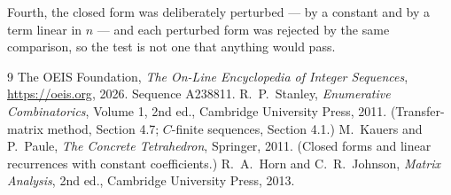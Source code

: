 \documentclass[11pt,a4paper]{article}
\theoremstyle{plain}
\theoremstyle{definition}
\begin{document}
Fourth, the closed form was deliberately perturbed --- by a constant and by a term linear in
$n$ --- and each perturbed form was rejected by the same comparison, so the test is not one
that anything would pass.

\begin{thebibliography}{9}
 The OEIS Foundation, \emph{The On-Line Encyclopedia of Integer
Sequences}, \url{https://oeis.org}, 2026. Sequence A238811.
 R.~P.~Stanley, \emph{Enumerative Combinatorics}, Volume 1, 2nd ed.,
Cambridge University Press, 2011. (Transfer-matrix method, Section 4.7; $C$-finite sequences,
Section 4.1.)
 M.~Kauers and P.~Paule, \emph{The Concrete Tetrahedron}, Springer, 2011.
(Closed forms and linear recurrences with constant coefficients.)
 R.~A.~Horn and C.~R.~Johnson, \emph{Matrix Analysis}, 2nd ed., Cambridge
University Press, 2013.
\end{thebibliography}
\end{document}
